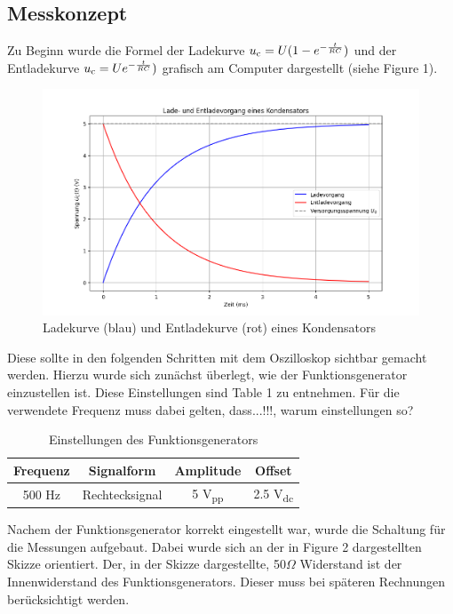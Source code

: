 \documentclass[a4paper,12pt]{article}
\begin{document}
\subsection{Messkonzept}
Zu Beginn wurde die Formel der Ladekurve \( u\textsubscript{c} = U (1 -e ^{-\frac{t}{RC}}) \) und der Entladekurve  \( u\textsubscript{c} = Ue ^{-\frac{t}{RC}}) \) grafisch am Computer dargestellt (siehe Figure 1). 

\begin{figure}[H]
    \centering
    \includegraphics[width=1.0\textwidth]{../Quellen/Labor2/Lade-EntladefunktionSkizze.png}
\caption{Ladekurve (blau) und Entladekurve (rot) eines Kondensators}
\end{figure}

\noindent Diese sollte in den folgenden Schritten mit dem Oszilloskop sichtbar gemacht werden. Hierzu wurde sich zunächst überlegt, wie der Funktionsgenerator einzustellen ist. Diese Einstellungen sind Table 1 zu entnehmen. Für die verwendete Frequenz muss dabei gelten, dass...!!!, warum einstellungen so?

\begin{table}[H]
	\centering
	\begin{tabular}{|c|c|c|c|}
		\hline
		\textbf{Frequenz} & \textbf{Signalform} & \textbf{Amplitude} & \textbf{Offset}\\
		\hline
		500 Hz & Rechtecksignal & 5 V\textsubscript{pp} & 2.5 V\textsubscript{dc}\\
		\hline
	\end{tabular}
	\caption{Einstellungen des Funktionsgenerators}
\end{table}

\noindent Nachem der Funktionsgenerator korrekt eingestellt war, wurde die Schaltung  für die Messungen aufgebaut. Dabei wurde sich an der in Figure 2 dargestellten Skizze orientiert. Der, in der Skizze dargestellte, 50$\Omega$ Widerstand ist der Innenwiderstand des Funktionsgenerators. Dieser muss bei späteren Rechnungen berücksichtigt werden.\\
\end{document}

